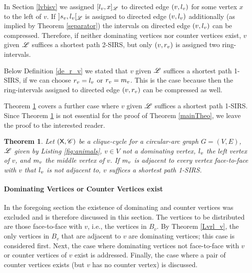\documentclass[10pt]{article}
\newtheorem{theorem}{Theorem}[section]
\newcommand{\rvv}{\rv{v}}
\newcommand{\mvv}{\mv{v}}
\newcommand{\svv}{s_v}
\begin{document}
In Section \ref{lvbisv} we assigned $[l_{v},x]_{\mathscr{L}}$ to directed edge $(v,l_{v})$
for some vertex $x$ to the left of $v$.
If $]\svv,\lvv[_\ri{L}$ is assigned to directed edge $(v,l_{v})$ 
additionally (as implied by Theorem \ref{separator}) 
the intervals on directed edge $(v,l_{v})$ can be compressed.
Therefore, if neither dominating vertices nor counter vertices exist, 
$v$ given $\mathscr{L}$ suffices a shortest path 2-SIRS, 
but only $(v,\rvv)$ is assigned two ring-intervals.

Below Definition \ref{de_r_v} we stated that $v$ given $\mathscr{L}$ suffices 
a shortest path 1-SIRS, if we can choose $\rvv=\lvv$ or $\rvv=\mvv$.
This is the case because then the ring-intervals assigned to directed edge $(v,\rvv)$ 
can be compressed as well.

Theorem \ref{theo:1sirs} covers a further case where $v$ given $\mathscr{L}$ suffices a shortest path 
1-SIRS.
Since Theorem \ref{theo:1sirs} is not essential for the proof of Theorem \ref{mainTheo}, 
we leave the proof to the interested reader.


\begin{theorem}\label{theo:1sirs}
Let $(\mathsf{X},\mathscr{C})$ be a clique-cycle for a circular-arc graph $G=(V,E)$, $\mathscr{L}$ 
given by Listing \ref{fig:animals}, $v\in V$ not a dominating vertex, $l_{v}$ the 
left vertex of $v$, and $\mvv$ the middle vertex of $v$.
If $\mvv$ is adjacent to every vertex face-to-face with $v$ that $l_{v}$ is not adjacent 
to, $v$ suffices a shortest path 1-SIRS.
\end{theorem}




\paragraph{Dominating Vertices or Counter Vertices exist}\label{gyros}





In the foregoing section the existence of dominating and counter vertices was excluded and is therefore discussed in this section.
The vertices to be distributed are those face-to-face with $v$, i.e., the vertices in $B_v$.
By Theorem \ref{Lvrl_v}, the only vertices in $B_v$ that are adjacent to $v$ are dominating vertices;
this case is considered first.
Next, the case where dominating vertices not face-to-face with $v$ or counter vertices of $v$ exist is addressed. Finally, the case where a pair of counter vertices exists (but $v$ has no counter vertex) is discussed. 
\end{document}
